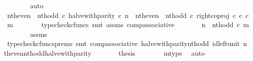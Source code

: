 \begin{isabellebody}
\ \ \ \ \ \ \isamarkupfalse%
\ auto\isanewline
\ \ \ \ \isamarkupfalse%
\ \isamarkupfalse%
\ {\isachardoublequoteopen}{\isacharparenleft}{\kern0pt}{\isacharparenleft}{\kern0pt}nth{\isacharunderscore}{\kern0pt}even\ {\isasymamalg}\ nth{\isacharunderscore}{\kern0pt}odd{\isacharparenright}{\kern0pt}\ {\isasymcirc}\isactrlsub c\ halve{\isacharunderscore}{\kern0pt}with{\isacharunderscore}{\kern0pt}parity{\isacharparenright}{\kern0pt}\ {\isasymcirc}\isactrlsub c\ n\ {\isacharequal}{\kern0pt}\ {\isacharparenleft}{\kern0pt}{\isacharparenleft}{\kern0pt}nth{\isacharunderscore}{\kern0pt}even\ {\isasymamalg}\ nth{\isacharunderscore}{\kern0pt}odd{\isacharparenright}{\kern0pt}\ {\isasymcirc}\isactrlsub c\ right{\isacharunderscore}{\kern0pt}coproj\ {\isasymnat}\isactrlsub c\ {\isasymnat}\isactrlsub c{\isacharparenright}{\kern0pt}\ {\isasymcirc}\isactrlsub c\ m{\isachardoublequoteclose}\isanewline
\ \ \ \ \ \ \isamarkupfalse%
\ {\isacharparenleft}{\kern0pt}typecheck{\isacharunderscore}{\kern0pt}cfuncs{\isacharcomma}{\kern0pt}\ smt\ assms\ comp{\isacharunderscore}{\kern0pt}associative{}{\isacharparenright}{\kern0pt}\isanewline
\ \ \ \ \isamarkupfalse%
\ \isamarkupfalse%
\ {\isachardoublequoteopen}n\ {\isacharequal}{\kern0pt}\ nth{\isacharunderscore}{\kern0pt}odd\ {\isasymcirc}\isactrlsub c\ m{\isachardoublequoteclose}\isanewline
\ \ \ \ \ \ \isamarkupfalse%
\ assms\ \isamarkupfalse%
\ {\isacharparenleft}{\kern0pt}typecheck{\isacharunderscore}{\kern0pt}cfuncs{\isacharunderscore}{\kern0pt}prems{\isacharcomma}{\kern0pt}\ smt\ comp{\isacharunderscore}{\kern0pt}associative{}\ halve{\isacharunderscore}{\kern0pt}with{\isacharunderscore}{\kern0pt}parity{\isacharunderscore}{\kern0pt}nth{\isacharunderscore}{\kern0pt}odd\ id{\isacharunderscore}{\kern0pt}left{\isacharunderscore}{\kern0pt}unit{}\ nth{\isacharunderscore}{\kern0pt}even{\isacharunderscore}{\kern0pt}nth{\isacharunderscore}{\kern0pt}odd{\isacharunderscore}{\kern0pt}halve{\isacharunderscore}{\kern0pt}with{\isacharunderscore}{\kern0pt}parity{\isacharparenright}{\kern0pt}\isanewline
\ \ \ \ \isamarkupfalse%
\ \isamarkupfalse%
\ {\isacharquery}{\kern0pt}thesis\isanewline
\ \ \ \ \ \ \isamarkupfalse%
\ m{\isacharunderscore}{\kern0pt}type\ \isamarkupfalse%
\ auto\isanewline
\ \ \isamarkupfalse%
\isanewline
{}\isamarkupfalse%
%
\endisatagproof
{\isafoldproof}%
%
\isadelimproof

\end{isabellebody}

